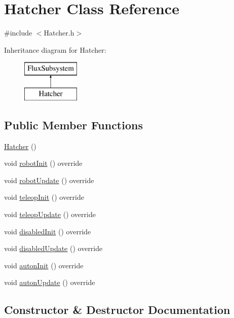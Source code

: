 \hypertarget{classHatcher}{}\section{Hatcher Class Reference}
\label{classHatcher}


{\ttfamily \#include $<$Hatcher.\+h$>$}

Inheritance diagram for Hatcher\+:\begin{figure}[H]
\begin{center}
\leavevmode
\includegraphics[height=2.000000cm]{classHatcher}
\end{center}
\end{figure}
\subsection*{Public Member Functions}
\begin{DoxyCompactItemize}
\item 
\hyperlink{classHatcher_aa8c7be4eea0af1a3d61b6d445aac487d}{Hatcher} ()
\item 
void \hyperlink{classHatcher_ae917b572274b45c8e695cd8e285a5d70}{robot\+Init} () override
\item 
void \hyperlink{classHatcher_aacf85f8cc9f1c523ef7c4cd91808201e}{robot\+Update} () override
\item 
void \hyperlink{classHatcher_ad51238ccec9093e1fa9c63f8f3aafa12}{teleop\+Init} () override
\item 
void \hyperlink{classHatcher_a91517b2f54f6c8fc0f27506963a71d20}{teleop\+Update} () override
\item 
void \hyperlink{classHatcher_a2e61639f734ec3a5627b655695bbadf1}{disabled\+Init} () override
\item 
void \hyperlink{classHatcher_ab6bb222ab940507490f2009f3113bc41}{disabled\+Update} () override
\item 
void \hyperlink{classHatcher_ac44bea31eb17578106c48914450a1be1}{auton\+Init} () override
\item 
void \hyperlink{classHatcher_a5e21dc019a7f05b4bbbf39545a920f5a}{auton\+Update} () override
\end{DoxyCompactItemize}


\subsection{Constructor \& Destructor Documentation}
\mbox{\label{classHatcher_aa8c7be4eea0af1a3d61b6d445aac487d}} 
